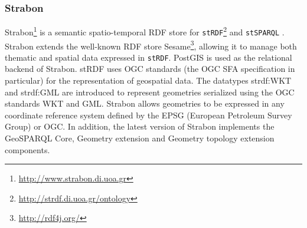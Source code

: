 \subsubsection{Strabon}
Strabon\footnote{\url{http://www.strabon.di.uoa.gr}} is a semantic spatio-temporal RDF store for \texttt{stRDF}\footnote{\url{http://strdf.di.uoa.gr/ontology}} and \texttt{stSPARQL} \cite{strabon12}. Strabon extends the well-known RDF store Sesame\footnote{\url{http://rdf4j.org/}}, allowing it to manage both thematic and spatial data expressed in \texttt{stRDF}. PostGIS is used as the relational backend of Strabon. 
stRDF uses OGC standards (the OGC SFA specification in particular) for the representation of geospatial data. 
The datatypes strdf:WKT and strdf:GML are introduced to represent geometries serialized using the OGC standards WKT and GML. Strabon allows geometries to be expressed in any coordinate reference system defined by the EPSG (European Petroleum Survey Group) or OGC. In addition, the latest version of Strabon implements the GeoSPARQL Core, Geometry extension and Geometry topology extension components. 

  

